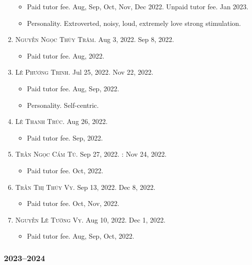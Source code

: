 \documentclass{article}
\begin{document}
\begin{enumerate}
	\begin{itemize}
		\item {\sf Paid tutor fee.} Aug, Sep, Oct, Nov, Dec 2022. {\sf Unpaid tutor fee.} Jan 2023.
		\item {\sf Personality.} Extroverted, noisy, loud, extremely love strong stimulation.
	\end{itemize}
	\item \textsc{Nguyễn Ngọc Thùy Trâm.} {\sf[In]} Aug 3, 2022. {\sf[Out]} Sep 8, 2022.
	\begin{itemize}
		\item {\sf Paid tutor fee.} Aug, 2022.
	\end{itemize}
	\item \textsc{Lê Phương Trinh.} {\sf[In]} Jul 25, 2022. {\sf[Out]} Nov 22, 2022.
	\begin{itemize}
		\item {\sf Paid tutor fee.} Aug, Sep, 2022.
		\item {\sf Personality.} Self-centric.
	\end{itemize}
	\item \textsc{Lê Thanh Trúc.} {\sf[In]} Aug 26, 2022. {\sf[Out]}
	\begin{itemize}
		\item {\sf Paid tutor fee.} Sep, 2022.
	\end{itemize}
	\item \textsc{Trần Ngọc Cẩm Tú.} {\sf[In]} Sep 27, 2022. {}: Nov 24, 2022.
	\begin{itemize}
		\item {\sf Paid tutor fee.} Oct, 2022.
	\end{itemize}
	\item \textsc{Trần Thị Thúy Vy.} {\sf[In]} Sep 13, 2022. {\sf[Out]} Dec 8, 2022.
	\begin{itemize}
		\item {\sf Paid tutor fee.} Oct, Nov, 2022.
	\end{itemize}
	\item \textsc{Nguyễn Lê Tường Vy.} {\sf[In]} Aug 10, 2022. {\sf[Out]} Dec 1, 2022.
	\begin{itemize}
		\item {\sf Paid tutor fee.} Aug, Sep, Oct, 2022.
	\end{itemize}
\end{enumerate}

\subsubsection{2023--2024}
\end{document}
